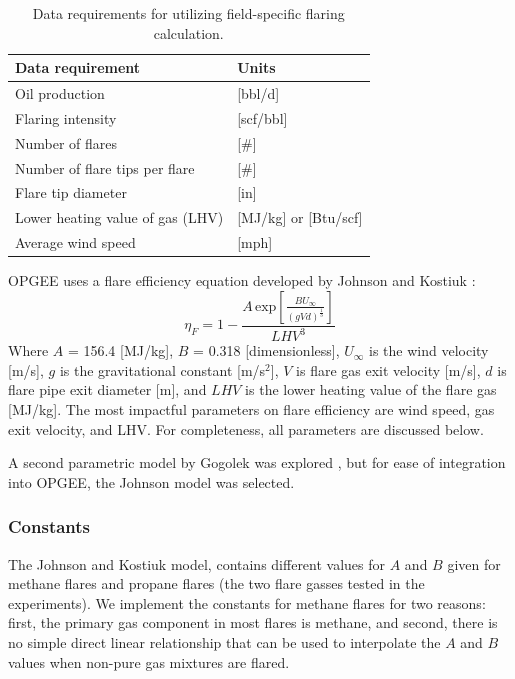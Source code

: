 \documentclass[11pt]{report}
\newcommand{\marg}[1]{{\footnotesize\textit{\textcolor{stanford}{'#1'}}}}
\newcommand{\marginnote}[1]{\marginpar{\marg{#1}}}
\begin{document}
\begin{table}
\begin{scriptsize}
\caption{Data requirements for utilizing field-specific flaring calculation.}
\label{tab:flaring_data_reqs}
\begin{tabular*}{1\columnwidth}{p{}p{}}
\toprule
Data requirement & Units \\
\midrule
Oil production & [bbl/d]\\
Flaring intensity & [scf/bbl] \\
Number of flares & [\#]\\
Number of flare tips per flare & [\#]\\
Flare tip diameter & [in]\\
Lower heating value of gas (LHV) & [MJ/kg] or [Btu/scf]\\
Average wind speed & [mph]\\
\bottomrule
\end{tabular*}
\end{scriptsize}
\end{table}



OPGEE uses a flare efficiency equation developed by Johnson and Kostiuk \cite{Johnson2002}: \marginnote{Flaring 3.1}
\begin{equation}\label{eq:flare_eta}
\eta_F =1-\frac{A \,\textrm{exp}\left[{\frac{BU_{\infty}}{\left(gVd\right)^\frac{1}{3}}}\right]}{LHV^3}
\end{equation}
Where $A$ = 156.4 [MJ/kg], $B$ = 0.318 [dimensionless], $U_{\infty}$ is the wind velocity [m/s], $g$ is the gravitational constant [m/s$^2$], $V$ is flare gas exit velocity [m/s], $d$ is flare pipe exit diameter [m], and $LHV$ is the lower heating value of the flare gas [MJ/kg]. The most impactful parameters on flare efficiency are wind speed, gas exit velocity, and LHV. For completeness, all parameters are discussed below.

A second parametric model by Gogolek was explored \cite{Gogolek2012}, but for ease of integration into OPGEE, the Johnson model was selected.
\subsubsection{Constants}
The Johnson and Kostiuk model, contains different values for $A$ and $B$ given for methane flares and propane flares (the two flare gasses tested in the experiments). We implement the constants for methane flares for two reasons: first, the primary gas component in most flares is methane, and second, there is no simple direct linear relationship that can be used to interpolate the $A$ and $B$ values when non-pure gas mixtures are flared.
\end{document}
